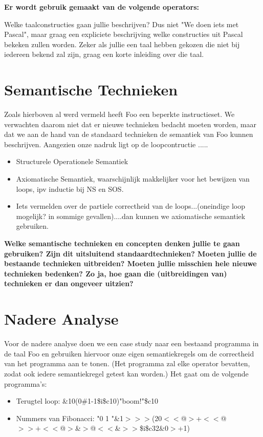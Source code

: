 \documentclass[11pt]{article}
\begin{document}
{\bf
Er wordt gebruik gemaakt van de volgende operators: 

Welke taalconstructies gaan jullie beschrijven? Dus niet "We doen iets met Pascal", maar graag een expliciete beschrijving welke constructies uit Pascal bekeken zullen worden. Zeker als jullie een taal hebben gekozen die niet bij iedereen bekend zal zijn, graag een korte inleiding over die taal.
}



\section{Semantische Technieken}

Zoals hierboven al werd vermeld heeft Foo een beperkte instructieset. We verwachten daarom niet dat er nieuwe technieken bedacht moeten worden, maar dat we aan de hand van de standaard technieken de semantiek van Foo kunnen beschrijven. Aangezien onze nadruk ligt op de loopcontructie .....

\begin{itemize}
\item Structurele Operationele Semantiek
\item Axiomatische Semantiek, waarschijnlijk makkelijker voor het bewijzen van loops, ipv inductie bij NS en SOS.
\item Iets vermelden over de partiele correctheid van de loops...(oneindige loop mogelijk? in sommige gevallen)....dan kunnen we axiomatische semantiek gebruiken.
\end{itemize}



{\bf
Welke semantische technieken en concepten denken jullie te gaan gebruiken? Zijn dit uitsluitend standaardtechnieken? Moeten jullie de bestaande technieken uitbreiden? Moeten jullie misschien hele nieuwe technieken bedenken? Zo ja, hoe gaan die (uitbreidingen van) technieken er dan ongeveer uitzien?
}
\section{Nadere Analyse}

Voor de nadere analyse doen we een case study naar een bestaand programma in de taal Foo en gebruiken hiervoor onze eigen semantiekregels om de correctheid van het programma aan te tonen. (Het programma zal elke operator bevatten, zodat ook iedere semantiekregel getest kan worden.) Het gaat om de volgende programma's:

\begin{itemize}
\item Terugtel loop: \&10(0\#1-1\$i\$c10)"boom!"\$c10
\item Nummers van Fibonacci: "0 1 "\&1\(>>>\)(20\(<<\)@\(>\)+\(<<\)@\(>>+<<\)@\(>\)\&\(>\)@\(<<\)\&\(>>\)\$i\$c32\&0\(>\)+1)
\end{itemize}
\end{document}
